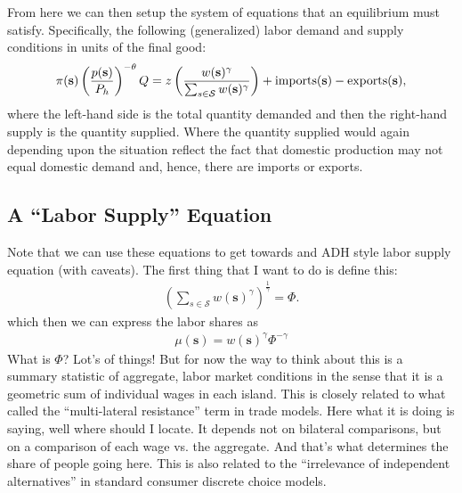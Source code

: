 \documentclass[pdftex,12pt]{article}
\begin{document}
From here we can then setup the system of equations that an equilibrium must satisfy. Specifically, the following (generalized) labor demand and supply conditions in units of the final good:
\begin{align}
\pi(\textbf{s}) \left(\frac{p(\textbf{s})}{P_h}\right)^{-\theta}Q =  z \left(\frac{w(\textbf{s})^{\gamma}}{\sum_{s \in \mathcal{S}} w(\textbf{s})^{\gamma}} \right) + \mbox{\normalfont imports}(\textbf{s}) - \mbox{\normalfont exports(\textbf{s})} ,
\end{align}
where the left-hand side is the total quantity demanded and then the right-hand supply is the quantity supplied. Where the quantity supplied would again depending upon the situation reflect the fact that domestic production may not equal domestic demand and, hence, there are imports or exports.

\newpage

\subsection{A ``Labor Supply'' Equation}

Note that we can use these equations to get towards and ADH style labor supply equation (with caveats). The first thing that I want to do is define this:
\begin{align}
\left(\sum_{s \in \mathcal{S}} w(\textbf{s})^{\gamma}\right)^{\frac{1}{\gamma}} = \Phi.
\label{eq:multi_lat_resit}
\end{align}
which then we can express the labor shares as
\begin{align}
\mu(\textbf{s}) = w(\textbf{s})^{\gamma}\Phi^{-\gamma}
\label{eq:simple_mu}
\end{align}
What is $\Phi$? Lot's of things! But for now the way to think about this is a summary statistic of aggregate, labor market conditions in the sense that it is a geometric sum of individual wages in each island. This is closely related to what \citet{anderson2004trade} called the ``multi-lateral resistance'' term in trade models. Here what it is doing is saying, well where should I locate. It depends not on bilateral comparisons, but on a comparison of each wage vs. the aggregate. And that's what determines the share of people going here. This is also related to the ``irrelevance of independent alternatives'' in standard consumer discrete choice models.
\end{document}
